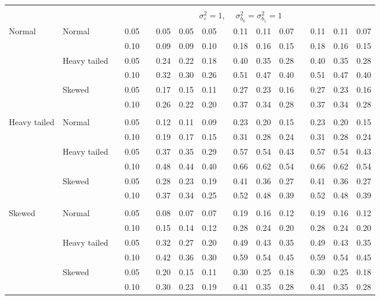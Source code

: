 \documentclass{article} %
\begin{document}
\begin{table}[ht]
\begin{scriptsize}
\begin{center}
\begin{tabular}{ll p{.1cm} c p{.1cm} rrr p{.1cm} rrr p{.1cm} rrr}
&&&&&&&&&&&&&&&\\
& && && \multicolumn{9}{c}{$\sigma_{\varepsilon}^2 = 1$, \ \ $\sigma_{b_0}^2 = \sigma_{b_1}^2 = 1$} \\ \cline{6-16}
Normal       & Normal       && 0.05 &&  0.05 & 0.05 & 0.05 && 0.11 & 0.11 & 0.07 && 0.11 & 0.11 & 0.07 \\ 
             &              && 0.10 &&  0.09 & 0.09 & 0.10 && 0.18 & 0.16 & 0.15 && 0.18 & 0.16 & 0.15 \\ 
             & Heavy tailed && 0.05 &&  0.24 & 0.22 & 0.18 && 0.40 & 0.35 & 0.28 && 0.40 & 0.35 & 0.28 \\ 
             &              && 0.10 &&  0.32 & 0.30 & 0.26 && 0.51 & 0.47 & 0.40 && 0.51 & 0.47 & 0.40 \\ 
             & Skewed       && 0.05 &&  0.17 & 0.15 & 0.11 && 0.27 & 0.23 & 0.16 && 0.27 & 0.23 & 0.16 \\ 
             &              && 0.10 &&  0.26 & 0.22 & 0.20 && 0.37 & 0.34 & 0.28 && 0.37 & 0.34 & 0.28 \\ 
             &&&&&&&&&&&&&&&\\
Heavy tailed & Normal       && 0.05 &&  0.12 & 0.11 & 0.09 && 0.23 & 0.20 & 0.15 && 0.23 & 0.20 & 0.15 \\ 
             &              && 0.10 &&  0.19 & 0.17 & 0.15 && 0.31 & 0.28 & 0.24 && 0.31 & 0.28 & 0.24 \\ 
             & Heavy tailed && 0.05 &&  0.37 & 0.35 & 0.29 && 0.57 & 0.54 & 0.43 && 0.57 & 0.54 & 0.43 \\ 
             &              && 0.10 &&  0.48 & 0.44 & 0.40 && 0.66 & 0.62 & 0.54 && 0.66 & 0.62 & 0.54 \\ 
             & Skewed       && 0.05 &&  0.28 & 0.23 & 0.19 && 0.41 & 0.36 & 0.27 && 0.41 & 0.36 & 0.27 \\ 
             &              && 0.10 &&  0.37 & 0.34 & 0.25 && 0.52 & 0.48 & 0.39 && 0.52 & 0.48 & 0.39 \\ 
             &&&&&&&&&&&&&&&\\
Skewed       & Normal       && 0.05 &&  0.08 & 0.07 & 0.07 && 0.19 & 0.16 & 0.12 && 0.19 & 0.16 & 0.12 \\ 
             &              && 0.10 &&  0.15 & 0.14 & 0.12 && 0.28 & 0.24 & 0.20 && 0.28 & 0.24 & 0.20 \\ 
             & Heavy tailed && 0.05 &&  0.32 & 0.27 & 0.20 && 0.49 & 0.43 & 0.35 && 0.49 & 0.43 & 0.35 \\ 
             &              && 0.10 &&  0.42 & 0.36 & 0.30 && 0.59 & 0.54 & 0.45 && 0.59 & 0.54 & 0.45 \\ 
             & Skewed       && 0.05 &&  0.20 & 0.15 & 0.11 && 0.30 & 0.25 & 0.18 && 0.30 & 0.25 & 0.18 \\ 
             &              && 0.10 &&  0.30 & 0.23 & 0.19 && 0.41 & 0.35 & 0.28 && 0.41 & 0.35 & 0.28 \\ 



\end{tabular}
\end{center}
\end{scriptsize}
\end{table}
\end{document}
